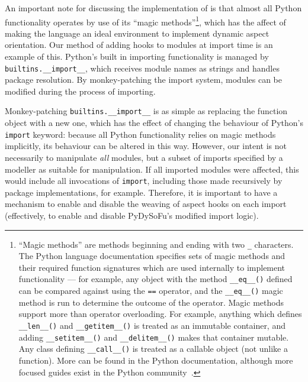 An important note for discussing the implementation of \pdsf is that almost all
Python functionality operates by use of its ``magic methods''\footnote{``Magic
methods'' are methods beginning and ending with two \lstinline{_} characters.
The Python language documentation specifies sets of magic methods and their
required function signatures which are used internally to implement
functionality --- for example, any object with the method \lstinline{__eq__()}
defined can be compared against using the \lstinline{==} operator, and the
\lstinline{__eq__()} magic method is run to determine the outcome of the
operator. Magic methods support more than operator overloading. For example,
anything which defines \lstinline{__len__()} and \lstinline{__getitem__()} is
treated as an immutable container, and adding \lstinline{__setitem__()} and
\lstinline{__delitem__()} makes that container mutable. Any class defining
\lstinline{__call__()} is treated as a callable object (not unlike a function).
More can be found in the Python documentation\cite{py3docs}, although more
focused guides exist in the Python community~\cite{magicmethodguide}.}, which
has the affect of making the language an ideal environment to implement dynamic
aspect orientation. Our method of adding hooks to modules at import time is an
example of this. Python's built in importing functionality is managed by
\lstinline{builtins.__import__}, which receives module names as strings and
handles package resolution. By monkey-patching the import system, modules can be
modified during the process of importing.

Monkey-patching \lstinline{builtins.__import__} is as simple as replacing the
function object with a new one, which has the effect of changing the behaviour
of Python's \lstinline{import} keyword: because all Python functionality relies
on magic methods implicitly, its behaviour can be altered in this way. However,
our intent is not necessarily to manipulate \emph{all} modules, but a subset of
imports specified by a modeller as suitable for manipulation. If all imported
modules were affected, this would include all invocations of \lstinline{import},
including those made recursively by package implementations, for example.
Therefore, it is important to have a mechanism to enable and disable the weaving
of aspect hooks on each import (effectively, to enable and disable PyDySoFu's
modified import logic). 


